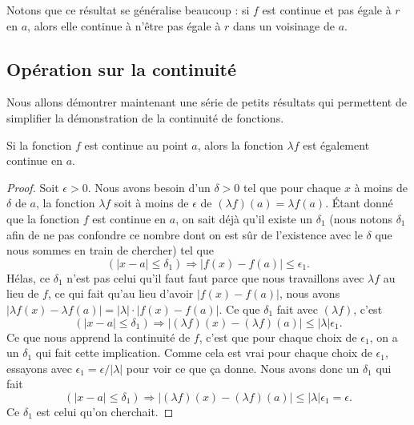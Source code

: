 Notons que ce résultat se généralise beaucoup : si \( f\) est continue et pas égale à \( r\) en \( a\), alors elle continue à n'être pas égale à \( r\) dans un voisinage de \( a\).

\subsection{Opération sur la continuité}

Nous allons démontrer maintenant une série de petits résultats qui permettent de simplifier la démonstration de la continuité de fonctions.
\begin{theorem}
Si la fonction $f$ est continue au point $a$, alors la fonction $\lambda f$ est également continue en $a$.
\end{theorem}

\begin{proof}
Soit $\epsilon>0$. Nous avons besoin d'un $\delta>0$ tel que pour chaque $x$ à moins de $\delta$ de $a$, la fonction $\lambda f$ soit à moins de $\epsilon$ de $(\lambda f)(a)=\lambda f(a)$. Étant donné que la fonction $f$ est continue en $a$, on sait déjà qu'il existe un $\delta_1$ (nous notons $\delta_1$ afin de ne pas confondre ce nombre dont on est sûr de l'existence avec le $\delta$ que nous sommes en train de chercher) tel que
\[
  (| x-a |\leq \delta_1)\Rightarrow | f(x)-f(a) |\leq \epsilon_1.
\]
Hélas, ce $\delta_1$ n'est pas celui qu'il faut faut parce que nous travaillons avec $\lambda f$ au lieu de $f$, ce qui fait qu'au lieu d'avoir $| f(x)-f(a) |$, nous avons $| \lambda f(x)-\lambda f(a) |=| \lambda |\cdot | f(x)-f(a) |$.  Ce que $\delta_1$ fait avec $(\lambda f)$, c'est
\[
  (| x-a |\leq\delta_1)\Rightarrow  | (\lambda f)(x)- (\lambda f)(a)|\leq | \lambda |\epsilon_1.
\]
Ce que nous apprend la continuité de $f$, c'est que pour chaque choix de $\epsilon_1$, on a un $\delta_1$ qui fait cette implication. Comme cela est vrai pour chaque choix de $\epsilon_1$, essayons avec $\epsilon_1=\epsilon/| \lambda |$ pour voir ce que ça donne. Nous avons donc un $\delta_1$ qui fait
\[
  (| x-a |\leq\delta_1)\Rightarrow  | (\lambda f)(x)- (\lambda f)(a)|\leq | \lambda |\epsilon_1=\epsilon.
\]
Ce $\delta_1$ est celui qu'on cherchait.
\end{proof}

